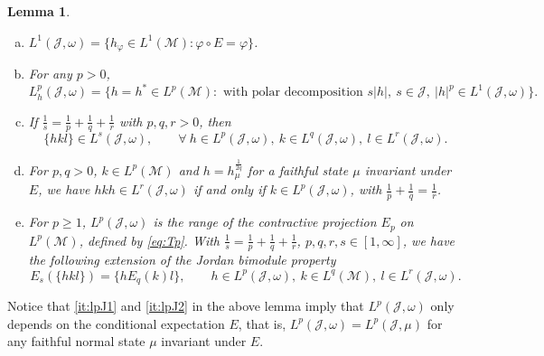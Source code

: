 \documentclass[12pt]{article}
\def\Me{\mathcal M}
\def\Je{\mathcal J}
\newtheorem{lemma}{Lemma}
\theoremstyle{definition}
\theoremstyle{remark}
\begin{document}
\begin{lemma}\label{lemma:lpJ}
\begin{enumerate}[(a)]
\item\label{it:lpJ1} 
$L^1(\Je,\omega)=\{h_\varphi\in L^1(\Me)\colon \varphi\circ E=\varphi\}$.
\item\label{it:lpJ2} For any $p>0$,
\[
L^p_h(\Je,\omega)=\{h=h^*\in L^p(\Me)\colon \text{ with polar decomposition } s|h|,\ s\in
\Je,\ |h|^p\in L^1(\Je,\omega)\}.
\]
\item\label{it:lpJ3} If $\frac1s = \frac1p+\frac1q+\frac1r$ with $p,q,r>0$, then 
\[
\{hkl\}\in L^s(\Je,\omega),\qquad \forall\ h\in L^p(\Je,\omega),\ k\in L^q(\Je,\omega),\ l
\in L^r(\Je,\omega).
\]
\item\label{it:lpJ4} For $p,q>0$, $k\in L^p(\Me)$ and $h=h_\mu^{\frac1{2q}}$ for a faithful
state $\mu$ invariant under $E$, we have $hkh\in
L^r(\Je,\omega)$ if and only if $k\in L^p(\Je,\omega)$, with $\frac1p+\frac1q=\frac1r$.
\item \label{it:lpJ5} For $p\ge 1$, $L^p(\Je,\omega)$ is the range of the contractive projection $E_p$ on 
$L^p(\Me)$, defined by \eqref{eq:Tp}. With
$\frac1s = \frac1p+\frac1q+\frac1r$,  $p,q,r,s \in [1,\infty]$, we have the following
extension of the Jordan bimodule
property 
\begin{equation}\label{eq:p_bimodule}
    E_s(\{hkl\}) = \{h E_q(k) l\}, \qquad h\in L^p(\Je,\omega),\ k\in L^q(\Me),\ l \in L^r(\Je,\omega).
\end{equation}


\end{enumerate}

\end{lemma}

Notice that \ref{it:lpJ1} and \ref{it:lpJ2} in the above lemma imply that
$L^p(\Je,\omega)$ only depends on the conditional expectation $E$, that is,
$L^p(\Je,\omega)=L^p(\Je,\mu)$ for any faithful normal state $\mu$ invariant under $E$.
\end{document}
